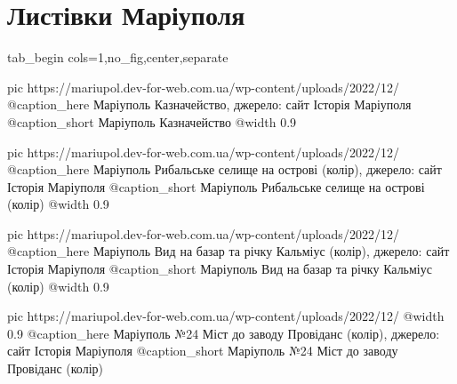  
 
 
 
 

\section{Листівки Маріуполя}

\ifcmt
  tab_begin cols=1,no_fig,center,separate

  pic https://mariupol.dev-for-web.com.ua/wp-content/uploads/2022/12/%
  @caption_here Маріуполь Казначейство, джерело: сайт Історія Маріуполя
  @caption_short Маріуполь Казначейство
  @width 0.9

  pic https://mariupol.dev-for-web.com.ua/wp-content/uploads/2022/12/%
  @caption_here Маріуполь Рибальське селище на острові (колір), джерело: сайт Історія Маріуполя
  @caption_short Маріуполь Рибальське селище на острові (колір)
  @width 0.9

  pic https://mariupol.dev-for-web.com.ua/wp-content/uploads/2022/12/%
  @caption_here Маріуполь Вид на базар та річку Кальміус (колір), джерело: сайт Історія Маріуполя
  @caption_short Маріуполь Вид на базар та річку Кальміус (колір)
  @width 0.9

  pic https://mariupol.dev-for-web.com.ua/wp-content/uploads/2022/12/%
  @width 0.9
  @caption_here Маріуполь №24 Міст до заводу Провіданс (колір), джерело: сайт Історія Маріуполя
  @caption_short Маріуполь №24 Міст до заводу Провіданс (колір)

